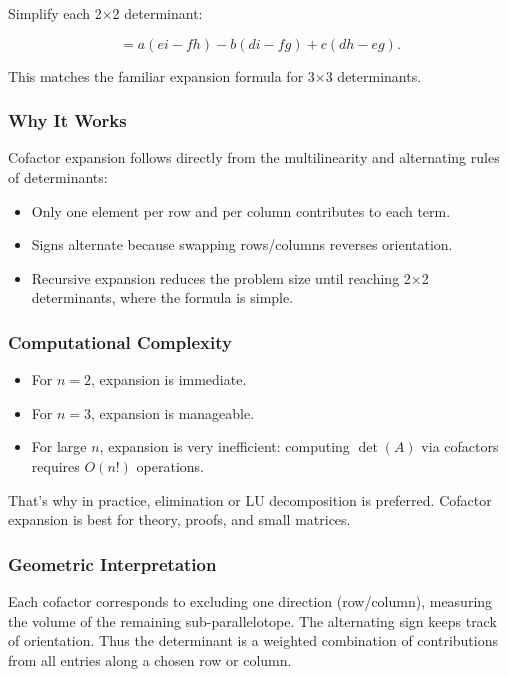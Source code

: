 \documentclass[
  letterpaper,
  DIV=11,
  numbers=noendperiod]{scrreprt}
\providecommand{\tightlist}{%
  \setlength{\itemsep}{0pt}\setlength{\parskip}{0pt}}
\begin{document}
Simplify each 2×2 determinant:

\[
= a(ei - fh) - b(di - fg) + c(dh - eg).
\]

This matches the familiar expansion formula for 3×3 determinants.

\subsubsection{Why It Works}\label{why-it-works}

Cofactor expansion follows directly from the multilinearity and
alternating rules of determinants:

\begin{itemize}
\tightlist
\item
  Only one element per row and per column contributes to each term.
\item
  Signs alternate because swapping rows/columns reverses orientation.
\item
  Recursive expansion reduces the problem size until reaching 2×2
  determinants, where the formula is simple.
\end{itemize}

\subsubsection{Computational Complexity}\label{computational-complexity}

\begin{itemize}
\tightlist
\item
  For \(n=2\), expansion is immediate.
\item
  For \(n=3\), expansion is manageable.
\item
  For large \(n\), expansion is very inefficient: computing \(\det(A)\)
  via cofactors requires \(O(n!)\) operations.
\end{itemize}

That's why in practice, elimination or LU decomposition is preferred.
Cofactor expansion is best for theory, proofs, and small matrices.

\subsubsection{Geometric
Interpretation}\label{geometric-interpretation-12}

Each cofactor corresponds to excluding one direction (row/column),
measuring the volume of the remaining sub-parallelotope. The alternating
sign keeps track of orientation. Thus the determinant is a weighted
combination of contributions from all entries along a chosen row or
column.
\end{document}
